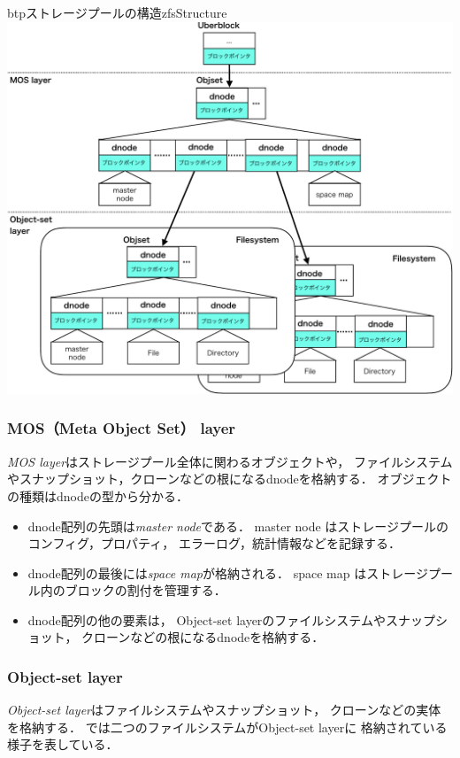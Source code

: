 \begin{myfig}{btp}{ストレージプールの構造}{zfsStructure}
  \centering\includegraphics[scale=0.7]{Fig/zfsStructure-crop.pdf}
\end{myfig}

\subsubsection{MOS（Meta Object Set） layer}
\emph{MOS layer}はストレージプール全体に関わるオブジェクトや，
ファイルシステムやスナップショット，クローンなどの根になるdnodeを格納する．
オブジェクトの種類はdnodeの型から分かる．
\begin{itemize}
\item dnode配列の先頭は\emph{master node}である．
  master node はストレージプールのコンフィグ，プロパティ，
  エラーログ，統計情報などを記録する．
\item dnode配列の最後には\emph{space map}が格納される．
  space map はストレージプール内のブロックの割付を管理する．
\item dnode配列の他の要素は，
  Object-set layerのファイルシステムやスナップショット，
  クローンなどの根になるdnodeを格納する．
\end{itemize}

\subsubsection{Object-set layer}
\emph{Object-set layer}はファイルシステムやスナップショット，
クローンなどの実体を格納する．
では二つのファイルシステムがObject-set layerに
格納されている様子を表している．

